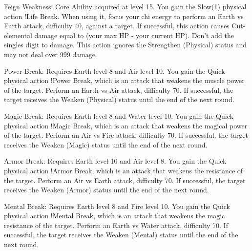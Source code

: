 \begin{ffminipage}
  Feign Weakness: Core Ability acquired at level 15. You gain the Slow(1) physical action !Life Break. When using it, focus your chi energy to perform an Earth vs Earth attack, difficulty 40, against a target. If successful, this action causes Cut-elemental damage equal to (your max HP - your current HP). Don’t add the singles digit to damage. This action ignores the Strengthen (Physical) status and may not deal over 999 damage.

  \begin{jobchoice}
    Power Break: Requires Earth level 8 and Air level 10. You gain the Quick physical action !Power Break, which is an attack that weakens the muscle power of the target. Perform an Earth vs Air attack, difficulty 70. If successful, the target receives the Weaken (Physical) status until the end of the next round.

    Magic Break: Requires Earth level 8 and Water level 10. You gain the Quick physical action !Magic Break, which is an attack that weakens the magical power of the target. Perform an Air vs Fire attack, difficulty 70. If successful, the target receives the Weaken (Magic) status until the end of the next round.

    Armor Break: Requires Earth level 10 and Air level 8. You gain the Quick physical action !Armor Break, which is an attack that weakens the resistance of the target. Perform an Air vs Earth attack, difficulty 70. If successful, the target receives the Weaken (Armor) status until the end of the next round.

    Mental Break: Requires Earth level 8 and Fire level 10. You gain the Quick physical action !Mental Break, which is an attack that weakens the magic resistance of the target. Perform an Earth vs Water attack, difficulty 70. If successful, the target receives the Weaken (Mental) status until the end of the next round.
  \end{jobchoice}
\end{ffminipage}


